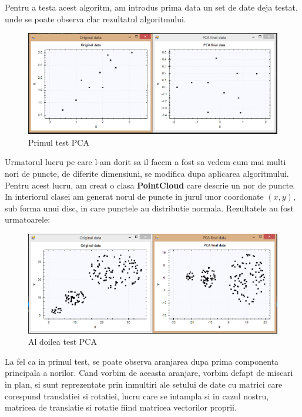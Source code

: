 \documentclass[12pt,oneside]{article}
\begin{document}
Pentru a testa acest algoritm, am introdus prima data un set de date deja testat, unde se poate observa clar rezultatul algoritmului.\cite{data_reduction}
\begin{figure}[H]
\centering
\caption{Primul test PCA}
\includegraphics[width=\linewidth]{Test1}
\end{figure}
\newpage

Urmatorul lucru pe care l-am dorit sa il facem a fost sa vedem cum mai multi nori de puncte, de diferite dimensiuni, se modifica dupa aplicarea algoritmului. Pentru acest lucru, am creat o clasa \textbf{PointCloud} care descrie un nor de puncte. In interiorul clasei am generat norul de puncte in jurul unor coordonate $\left(x,y\right)$, sub forma unui disc, in care punctele au distributie normala. Rezultatele au fost urmatoarele:

\begin{figure}[H]
\centering
\caption{Al doilea test PCA}
\includegraphics[width=\linewidth]{Test2}
\end{figure}

La fel ca in primul test, se poate observa aranjarea dupa prima componenta principala a norilor. Cand vorbim de aceasta aranjare, vorbim defapt de miscari in plan, si sunt reprezentate prin inmultiri ale setului de date cu matrici care corespund translatiei si rotatiei, lucru care se intampla si in cazul nostru, matricea de translatie si rotatie fiind matricea vectorilor proprii.
\end{document}
